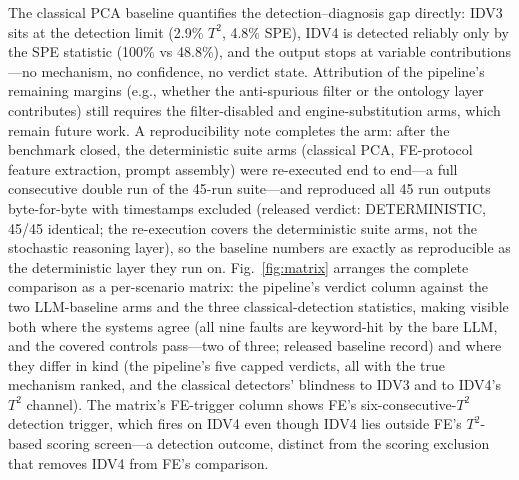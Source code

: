 \documentclass[preprint,12pt]{elsarticle}
\begin{document}
The classical PCA baseline quantifies the detection--diagnosis gap directly: IDV3 sits at the detection limit (2.9\% $T^2$, 4.8\% SPE), IDV4 is detected reliably only by the SPE statistic (100\% vs 48.8\%), and the output stops at variable contributions---no mechanism, no confidence, no verdict state. Attribution of the pipeline's remaining margins (e.g., whether the anti-spurious filter or the ontology layer contributes) still requires the filter-disabled and engine-substitution arms, which remain future work. A reproducibility note completes the arm: after the benchmark closed, the deterministic suite arms (classical PCA, FE-protocol feature extraction, prompt assembly) were re-executed end to end---a full consecutive double run of the 45-run suite---and reproduced all 45 run outputs byte-for-byte with timestamps excluded (released verdict: DETERMINISTIC, 45/45 identical; the re-execution covers the deterministic suite arms, not the stochastic reasoning layer), so the baseline numbers are exactly as reproducible as the deterministic layer they run on. Fig.~\ref{fig:matrix} arranges the complete comparison as a per-scenario matrix: the pipeline's verdict column against the two LLM-baseline arms and the three classical-detection statistics, making visible both where the systems agree (all nine faults are keyword-hit by the bare LLM, and the covered controls pass---two of three; released baseline record) and where they differ in kind (the pipeline's five capped verdicts, all with the true mechanism ranked, and the classical detectors' blindness to IDV3 and to IDV4's $T^2$ channel). The matrix's FE-trigger column shows FE's six-consecutive-$T^2$ detection trigger, which fires on IDV4 even though IDV4 lies outside FE's $T^2$-based scoring screen---a detection outcome, distinct from the scoring exclusion that removes IDV4 from FE's comparison.
\end{document}
